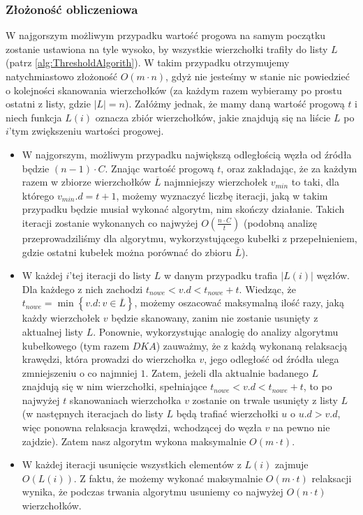 \subsubsection{Złożoność obliczeniowa}

W najgorszym możliwym przypadku wartość progowa na samym początku zostanie ustawiona na tyle wysoko, by wszystkie wierzchołki trafiły do listy $L$ (patrz \ref{alg:ThresholdAlgorith}). W takim przypadku otrzymujemy natychmiastowo złożoność $O \left( m \cdot n \right)$, gdyż nie jesteśmy w stanie nic powiedzieć o kolejności skanowania wierzchołków (za każdym razem wybieramy po prostu ostatni z listy, gdzie $ \left| L \right| = n $). Załóżmy jednak, że mamy daną wartość progową $t$ i niech funkcja $L \left( i \right)$ oznacza zbiór wierzchołków, jakie znajdują się na liście $L$ po $i$'tym zwiększeniu wartości progowej.

\begin{itemize}
\item W najgorszym, możliwym przypadku największą odległością węzła od źródła będzie $ \left( n - 1 \right) \cdot C $. Znając wartość progową $t$, oraz zakładając, że za każdym razem w zbiorze wierzchołków $\overline{L}$ najmniejszy wierzchołek $v_{min}$ to taki, dla którego $v_{min}.d = t + 1$, możemy wyznaczyć liczbę iteracji, jaką w takim przypadku będzie musiał wykonać algorytm, nim skończy działanie. Takich iteracji zostanie wykonanych co najwyżej $ O \left( \frac{n \cdot C}{t}\right)$ (podobną analizę przeprowadziliśmy dla algorytmu, wykorzystującego kubełki z przepełnieniem, gdzie ostatni kubełek można porównać do zbioru $\overline{L}$).
\item W każdej $i$'tej iteracji do listy $L$ w danym przypadku trafia $\left| L \left( i \right) \right|$ węzłów. Dla każdego z nich zachodzi $t_{nowe} < v.d < t_{nowe} + t$. Wiedząc, że $t_{nowe} = \min \left\{ v.d : v \in \overline{L} \right\}$, możemy oszacować maksymalną ilość razy, jaką każdy wierzchołek $v$ będzie skanowany, zanim nie zostanie usunięty z aktualnej listy $L$. Ponownie, wykorzystując analogię do analizy algorytmu kubełkowego (tym razem $DKA$) zauważmy, że z każdą wykonaną relaksacją krawędzi, która prowadzi do wierzchołka $v$, jego odległość od źródła ulega zmniejszeniu o co najmniej $1$. Zatem, jeżeli dla aktualnie badanego $L$ znajdują się w nim wierzchołki, spełniające $t_{nowe} < v.d < t_{nowe} + t $, to po najwyżej $t$ skanowaniach wierzchołka $v$ zostanie on trwale usunięty z listy $L$ (w następnych iteracjach do listy $L$ będą trafiać wierzchołki $u$ o $u.d > v.d$, więc ponowna relaksacja krawędzi, wchodzącej do węzła $v$ na pewno nie zajdzie). Zatem nasz algorytm wykona maksymalnie $ O \left( m \cdot t \right)$.
\item W każdej iteracji usunięcie wszystkich elementów z $L \left( i \right)$ zajmuje $ O \left( L \left( i \right) \right)$. Z faktu, że możemy wykonać maksymalnie $O \left( m \cdot t \right)$ relaksacji wynika, że podczas trwania algorytmu usuniemy co najwyżej $O \left( n \cdot t \right)$ wierzchołków.
\end{itemize}

